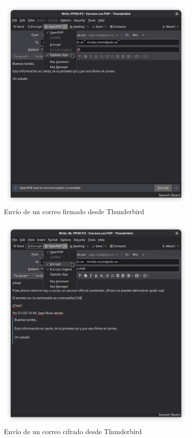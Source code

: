 \begin{figure}[H]
    \includegraphics[width=10cm]{thunderbird-firmado.png}
    \caption{Envío de un correo firmado desde Thunderbird}
\end{figure}

\begin{figure}[H]
    \includegraphics[width=10cm]{thunderbird-cifrado.png}
    \caption{Envío de un correo cifrado desde Thunderbird}
\end{figure}

